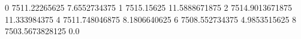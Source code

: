 0 7511.22265625 7.6552734375
1 7515.15625 11.5888671875
2 7514.9013671875 11.333984375
4 7511.748046875 8.1806640625
6 7508.552734375 4.9853515625
8 7503.5673828125 0.0

